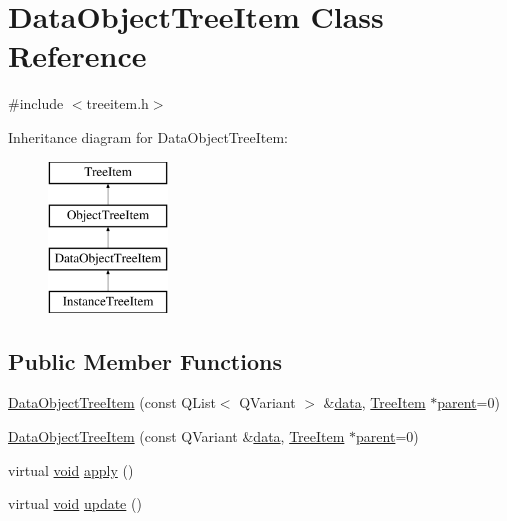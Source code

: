 \hypertarget{class_data_object_tree_item}{\section{\-Data\-Object\-Tree\-Item \-Class \-Reference}
\label{class_data_object_tree_item}
}


{\ttfamily \#include $<$treeitem.\-h$>$}

\-Inheritance diagram for \-Data\-Object\-Tree\-Item\-:\begin{figure}[H]
\begin{center}
\leavevmode
\includegraphics[height=4.000000cm]{class_data_object_tree_item}
\end{center}
\end{figure}
\subsection*{\-Public \-Member \-Functions}
\begin{DoxyCompactItemize}
\item 
\hyperlink{group___u_a_v_object_browser_plugin_gabc056eda5e72e5f0bebe3fd41fd5f552}{\-Data\-Object\-Tree\-Item} (const \-Q\-List$<$ \-Q\-Variant $>$ \&\hyperlink{group___u_a_v_object_browser_plugin_ga7c5708ae3cbba9c509f497c493beccb6}{data}, \hyperlink{class_tree_item}{\-Tree\-Item} $\ast$\hyperlink{group___u_a_v_object_browser_plugin_gaa3a7ba624312b6be70872634db291881}{parent}=0)
\item 
\hyperlink{group___u_a_v_object_browser_plugin_ga1a938e6bed78334aef5b0a9c4050e847}{\-Data\-Object\-Tree\-Item} (const \-Q\-Variant \&\hyperlink{group___u_a_v_object_browser_plugin_ga7c5708ae3cbba9c509f497c493beccb6}{data}, \hyperlink{class_tree_item}{\-Tree\-Item} $\ast$\hyperlink{group___u_a_v_object_browser_plugin_gaa3a7ba624312b6be70872634db291881}{parent}=0)
\item 
virtual \hyperlink{group___u_a_v_objects_plugin_ga444cf2ff3f0ecbe028adce838d373f5c}{void} \hyperlink{group___u_a_v_object_browser_plugin_gab322316ea60cf5981a289051b8d486b3}{apply} ()
\item 
virtual \hyperlink{group___u_a_v_objects_plugin_ga444cf2ff3f0ecbe028adce838d373f5c}{void} \hyperlink{group___u_a_v_object_browser_plugin_ga758265673ec0372a0dbb0ccd04d957d2}{update} ()
\end{DoxyCompactItemize}


